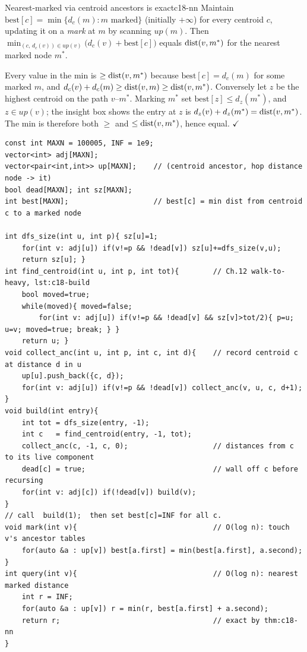 \begin{theorem}{Nearest-marked via centroid ancestors is exact}{c18-nn}
Maintain \(\text{best}[c]=\min\{d_c(m): m \text{ marked}\}\) (initially \(+\infty\)) for
every centroid \(c\), updating it on a \emph{mark} at \(m\) by scanning \(\mathit{up}(m)\).
Then \(\min_{(c,\,d_c(v))\in\mathit{up}(v)}\big(d_c(v)+\text{best}[c]\big)\) equals
\(\operatorname{dist}(v,m^\ast)\) for the nearest marked node \(m^\ast\).
\end{theorem}
\begin{proofbox}
Every value in the min is \(\ge\operatorname{dist}(v,m^\ast)\) because \(\text{best}[c]=d_c(m)\) for
some marked \(m\), and \(d_c(v)+d_c(m)\ge\operatorname{dist}(v,m)\ge\operatorname{dist}(v,m^\ast)\). Conversely let
\(z\) be the highest centroid on the path \(v\text{--}m^\ast\). Marking \(m^\ast\) set
\(\text{best}[z]\le d_z(m^\ast)\), and \(z\in\mathit{up}(v)\); the insight box shows the
entry at \(z\) is \(d_z(v)+d_z(m^\ast)=\operatorname{dist}(v,m^\ast)\). The min is therefore both
\(\ge\) and \(\le\operatorname{dist}(v,m^\ast)\), hence equal. \(\checkmark\)
\end{proofbox}

\begin{lstlisting}[caption={Build the centroid distance index and answer mark / nearest-marked online. Each operation scans one node's centroid-ancestor list, so it costs O(log n). This is the Xenia-and-Tree pattern; dfs size and find centroid are exactly lst:c18-build. ASCII only}, label={lst:c18-index}]
const int MAXN = 100005, INF = 1e9;
vector<int> adj[MAXN];
vector<pair<int,int>> up[MAXN];    // (centroid ancestor, hop distance node -> it)
bool dead[MAXN]; int sz[MAXN];
int best[MAXN];                    // best[c] = min dist from centroid c to a marked node

int dfs_size(int u, int p){ sz[u]=1;
    for(int v: adj[u]) if(v!=p && !dead[v]) sz[u]+=dfs_size(v,u);
    return sz[u]; }
int find_centroid(int u, int p, int tot){        // Ch.12 walk-to-heavy, lst:c18-build
    bool moved=true;
    while(moved){ moved=false;
        for(int v: adj[u]) if(v!=p && !dead[v] && sz[v]>tot/2){ p=u; u=v; moved=true; break; } }
    return u; }
void collect_anc(int u, int p, int c, int d){    // record centroid c at distance d in u
    up[u].push_back({c, d});
    for(int v: adj[u]) if(v!=p && !dead[v]) collect_anc(v, u, c, d+1);
}
void build(int entry){
    int tot = dfs_size(entry, -1);
    int c   = find_centroid(entry, -1, tot);
    collect_anc(c, -1, c, 0);                    // distances from c to its live component
    dead[c] = true;                              // wall off c before recursing
    for(int v: adj[c]) if(!dead[v]) build(v);
}
// call  build(1);  then set best[c]=INF for all c.
void mark(int v){                                // O(log n): touch v's ancestor tables
    for(auto &a : up[v]) best[a.first] = min(best[a.first], a.second);
}
int query(int v){                                // O(log n): nearest marked distance
    int r = INF;
    for(auto &a : up[v]) r = min(r, best[a.first] + a.second);
    return r;                                    // exact by thm:c18-nn
}
\end{lstlisting}

